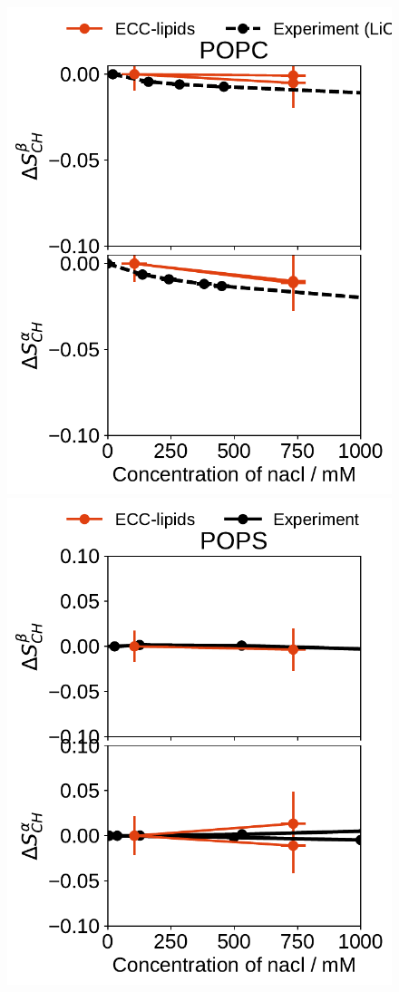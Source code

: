 \begin{figure}[htb!]
  \includegraphics[width=\figwidth]{../img/ecc_pops/order_parameters_changes_A-B_POPC_nacl.pdf} 
  \includegraphics[width=\figwidth]{../img/ecc_pops/order_parameters_changes_A-B_POPS_nacl.pdf} 

\end{figure}
